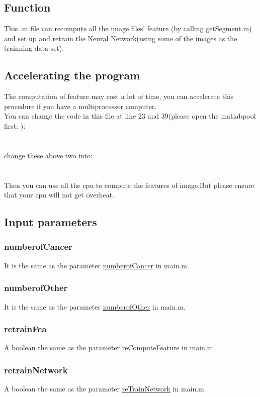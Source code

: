 \documentclass[14pt]{report} %
\begin{document}
\subsection{Function}
	This .m file can recompute all the image files' feature (by calling getSegment.m) and set up and retrain the Neural Network(using some of the images as the trainning data set).
\subsection{Accelerating the program}
\label{subsection:Accelerating the program}
	The computation of feature may cost a lot of time, you can accelerate this procedure if you have a multiprocessor computer.
	\\You can change the code in this file at line 23 and 39(please open the matlabpool first:	):
	\\
	\\
	\\change these above two into:
	\\
	\\
	\\Then you can use all the cpu to compute the features of image.But please ensure that your cpu will not get overheat.
\subsection{Input parameters}
\subsubsection{numberofCancer}
	It is the same as the parameter \hyperref[par:numberofCancer]{numberofCancer} in main.m.
\subsubsection{numberofOther}
	It is the same as the parameter \hyperref[par:numberofOther]{numberofOther} in main.m.
\subsubsection{retrainFea}
	A boolean the same as the parameter  \hyperref[par:reComputeFeature]{reComputeFeature}  in main.m.
\subsubsection{retrainNetwork}
	A boolean the same as the parameter  \hyperref[par:reTrainNetwork]{reTrainNetwork}  in main.m.
\end{document}
